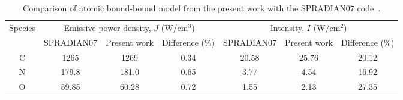 \begin{table}[h]
 \small
 \center
 \caption{Comparison of atomic bound-bound model from the present work with the SPRADIAN07 code~\cite{hyun_phd}.}
 \label{tab:spradian_atom_compare}
 \begin{tabular*}{1.0\textwidth}{ccccccc}
  \hline Species                          & \multicolumn{3}{c}{Emissive power density, $J$ (W/cm$^3$)}        & \multicolumn{3}{c}{Intensity, $I$ (W/cm$^2$)}      \\
                                                      & SPRADIAN07 & Present work & Difference (\%)                      & SPRADIAN07 & Present work & Difference (\%) \\
  \hline  
                  C                                & 1265              & 1269      & 0.34                                                  & 20.58            & 25.76  &  20.12 \\
                  N                                &  179.8            &  181.0    & 0.65                                                  & 3.77              & 4.54     &  16.92 \\
                  O                                &  59.85            &    60.28  & 0.72                                                  & 1.55              & 2.13     &  27.35 \\
  \hline
 \end{tabular*}
\end{table}

